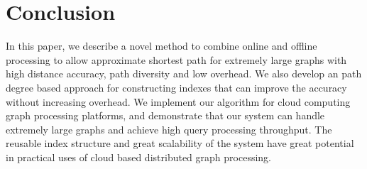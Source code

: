 \section{Conclusion}
\label{conclusion}

In this paper, we describe a novel method to combine online and offline processing to allow approximate shortest path for extremely large graphs with high distance accuracy, path diversity and low overhead. 
We also develop an path degree based approach for constructing indexes that can improve the accuracy without increasing overhead. We implement our algorithm for cloud computing graph processing platforms, and demonstrate that our system can handle extremely large graphs and achieve high query processing throughput. The reusable index structure and great scalability of the system have great potential in practical uses of cloud based distributed graph processing.
